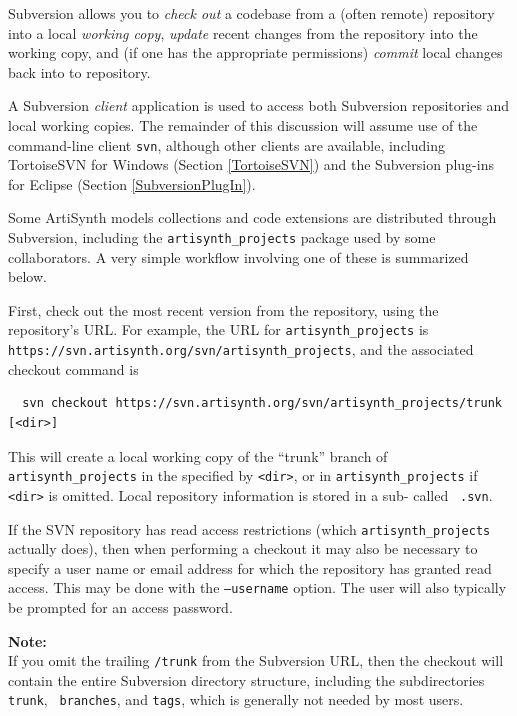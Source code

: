 Subversion allows you to {\it check out} a codebase from a (often
remote) repository into a local {\it working copy}, {\it update}
recent changes from the repository into the working copy, and (if one
has the appropriate permissions) {\it commit} local changes back into
to repository.

A Subversion {\it client} application is used to access both
Subversion repositories and local working copies. The remainder of
this discussion will assume use of the command-line client {\tt svn},
although other clients are available, including TortoiseSVN for
Windows 
\ifWindows
(Section \ref{TortoiseSVN}) 
\fi
and the Subversion plug-ins for
Eclipse (Section \ref{SubversionPlugIn}).

Some ArtiSynth models collections and code extensions are distributed
through Subversion, including the {\tt artisynth\_projects} package
used by some collaborators. A very simple workflow involving one of
these is summarized below.

First, check out the most recent version from the repository, using
the repository's URL. For example, the URL for {\tt artisynth\_projects}
is {\tt https://svn.artisynth.org/svn/artisynth\_projects},
and the associated checkout command is
\begin{verbatim}
  svn checkout https://svn.artisynth.org/svn/artisynth_projects/trunk [<dir>]
\end{verbatim}
This will create a local working copy of the ``trunk'' branch of {\tt
artisynth\_projects} in the \directory{} specified by {\tt <dir>},
or in {\tt artisynth\_projects} if {\tt <dir>} is omitted. Local
repository information is stored in a sub-\directory{} called {\tt
.svn}.

If the SVN repository has read access restrictions (which 
{\tt artisynth\_projects} actually does), then when performing a
checkout it may also be necessary to specify a user name or email
address for which the repository has granted read access. This may be
done with the {\tt --username} option. The user will also
typically be prompted for an access password.

\begin{sideblock}
{\bf Note:}\\ 
If you omit the trailing {\tt /trunk} from the
Subversion URL, then the checkout will contain the entire Subversion
directory structure, including the subdirectories {\tt trunk}, {\tt
branches}, and {\tt tags}, which is generally not needed by most
users.
\end{sideblock}

